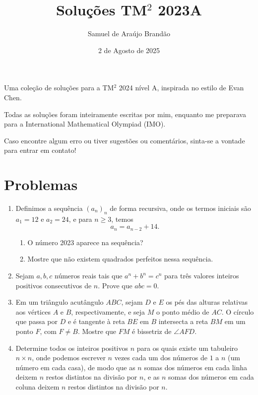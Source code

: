 \documentclass[12pt]{article}
\title{\sffamily\bfseries{Soluções TM$^2$ 2023A}}
\author{Samuel de Araújo Brandão}
\date{2 de Agosto de 2025}
\begin{document}
  \maketitle

  Uma coleção de soluções para a TM$^2$ 2024 nível A, inspirada no estilo de Evan Chen.

  Todas as soluções foram inteiramente escritas por mim, enquanto me preparava para a
  International Mathematical Olympiad (IMO).

  Caso encontre algum erro ou tiver sugestões ou comentários, sinta-se a vontade 
  para entrar em contato!

  \tableofcontents

  \clearpage

  \section{\textsf{Problemas}}
    \begin{enumerate}[label=\textbf{\arabic*.}]
      \item  Definimos a sequência \( (a_n)_n \) de forma recursiva, onde os termos
        iniciais são \( a_1 = 12 \) e \( a_2 = 24 \), e para \( n \geq 3 \), temos
        \[ a_n = a_{n-2} + 14. \]
        \begin{enumerate}[label=(\alph*)]
          \item O número 2023 aparece na sequência?
          \item Mostre que não existem quadrados perfeitos nessa sequência.
        \end{enumerate}

      \item  Sejam \( a, b, c \) números reais tais que \( a^n + b^n = c^n \) para três
        valores inteiros positivos consecutivos de \( n \). Prove que \( abc = 0 \).

      \item   Em um triângulo acutângulo \( ABC \), sejam \( D \) e \( E \) os pés das
        alturas relativas aos vértices \( A \) e \( B \), respectivamente, e seja
        \( M \) o ponto médio de \( AC \). O círculo que passa por \( D \) e é tangente
        à reta \( BE \) em \( B \) intersecta a reta \( BM \) em um ponto \( F \), com
        \( F \ne B \). Mostre que \( FM \) é bissetriz de \( \angle AFD \).

      \item   Determine todos os inteiros positivos \( n \) para os quais existe um
        tabuleiro \( n \times n \), onde podemos escrever \( n \) vezes cada um dos
        números de \( 1 \) a \( n \) (um número em cada casa), de modo que as \( n \)
        somas dos números em cada linha deixem \( n \) restos distintos na divisão por
        \( n \), e as \( n \) somas dos números em cada coluna deixem \( n \) restos
        distintos na divisão por \( n \).
    \end{enumerate}
\end{document}
